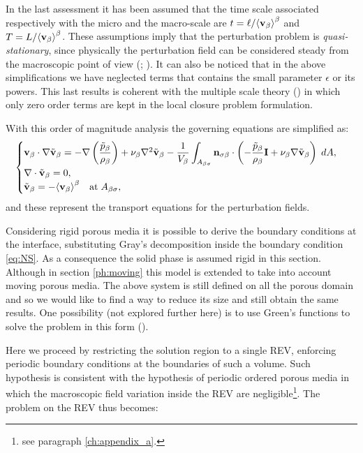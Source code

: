In the last assessment it has been assumed that the time scale associated respectively with the micro and the macro-scale are $t = \ell/{\left< \textbf{v}_{\beta} \right>}^{\beta}$ and $T =L/{\left< \textbf{v}_{\beta} \right>}^{\beta}$.
These assumptions imply that the perturbation problem is \textit{quasi-stationary}, since physically the perturbation field can be considered steady from the macroscopic point of view (\citet{davit2013homogenization}; \citet{zhu2014study}).
It can also be noticed that in the above simplifications we have neglected terms that contains the small parameter $\epsilon$ or its powers. This last results is coherent with the multiple scale theory (\citet{mei2010homogenization}) in which only zero order terms are kept in the local closure problem formulation.

With this order of magnitude analysis the governing equations are simplified as:
\begin{eqnarray}
	\begin{cases}
		\textbf{v}_{\beta} \cdot \nabla \tilde{\textbf{v}}_{\beta} = -\nabla \left(\dfrac{\tilde{p}_{\beta}}{\rho_{\beta}}\right) + \nu_{\beta} \nabla^2 \tilde{\textbf{v}}_{\beta} - \dfrac{1}{V_\beta} \displaystyle \int_{A_{\beta \sigma}} \mathbf{n}_{\sigma \beta}  \cdot \left(-\dfrac{\tilde{p}_{\beta}}{\rho_{\beta}} \mathbf{I}  + \nu_{\beta} \nabla \tilde{\textbf{v}}_{\beta} \right)  \;dA,  \\
		\nabla \cdot \tilde{\textbf{v}}_{\beta} = 0,  \\
		\tilde{\textbf{v}}_{\beta} = -{\left< \textbf{v}_{\beta} \right>}^{\beta} \quad \textrm{at} \; A_{\beta \sigma},
	\end{cases}
\label{eq:vans_mom_}
\end{eqnarray}
and these represent the transport equations for the perturbation fields.

Considering rigid porous media it is possible to derive the boundary conditions at the interface, substituting Gray's decomposition inside the boundary condition  \eqref{eq:NS}. As a consequence the solid phase is assumed rigid in this section. Although in section \ref{ph:moving} this model is extended to take into account moving porous media.
The above system is still defined on all the porous domain and so we would like to find a way to reduce its size and still obtain the same results.
One possibility (not explored further here) is to use Green's functions to solve the problem in this form (\citet{wood2013volume}).

Here we proceed by restricting the solution region to a single REV, enforcing periodic boundary conditions at the boundaries of such a volume.
Such hypothesis is consistent with the hypothesis of periodic ordered porous media in which the macroscopic field variation inside the REV are negligible\footnote{see paragraph \ref{ch:appendix_a}.}.
The problem on the REV thus becomes:

